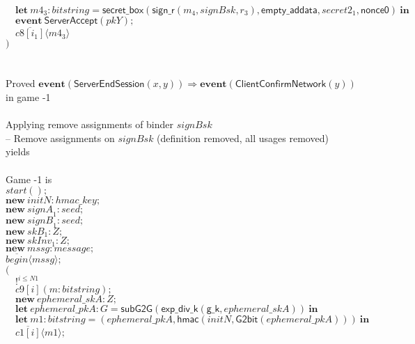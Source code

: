 \documentclass{article}
\newcommand{\cinput}[2]{{#1}({#2})}
\newcommand{\coutput}[2]{\overline{#1}\langle{#2}\rangle}
\newcommand{\kw}[1]{\mathbf{#1}}
\newcommand{\kwf}[1]{\mathsf{#1}}
\newcommand{\var}[1]{\mathit{#1}}
\newcommand{\kwt}[1]{\mathit{#1}}
\newcommand{\kwp}[1]{\mathit{#1}}
\newcommand{\kwc}[1]{\mathit{#1}}
\begin{document}
\begin{tabbing}
\>$\quad \kw{let}\ \var{m4}_{3}: \kwt{bitstring} = \kwf{secret{\_}box}(\kwf{sign{\_}r}(\var{m}_{4}, \var{signBsk}, \var{r}_{3}), \kwf{empty{\_}addata}, \var{secret2}_{1}, \kwf{nonce0})\ \kw{in}$\\
\>$\quad \kw{event}\ \kwf{ServerAccept}(\var{pkY});$\\
\>$\quad \coutput{\kwc{c8}[\var{i}_{1}]}{\var{m4}_{3}}$\\
\>$)$\\
\\
\\
Proved $\kw{event}(\kwf{ServerEndSession}(\var{x}, \var{y})) \Longrightarrow \kw{event}(\kwf{ClientConfirmNetwork}(\var{y}))$ in game -1\\
\\
Applying remove assignments of binder $\var{signBsk}$\\
\quad -- Remove assignments on $\var{signBsk}$ (definition removed, all usages removed)\\
yields\\
\\
Game -1 is\\
\>$\cinput{\kwc{start}}{};$\\
\>$\kw{new}\ \var{initN}: \kwt{hmac{\_}key};$\\
\>$\kw{new}\ \var{signA}_{1}: \kwt{seed};$\\
\>$\kw{new}\ \var{signB}_{1}: \kwt{seed};$\\
\>$\kw{new}\ \var{skB}_{1}: \kwt{Z};$\\
\>$\kw{new}\ \var{skInv}_{1}: \kwt{Z};$\\
\>$\kw{new}\ \var{mssg}: \kwt{message};$\\
\>$\coutput{\kwc{begin}}{\var{mssg}};$\\
\>$($\\
\>$\quad !^{\var{i} \leq \kwp{N1}}$\\
\>$\quad \cinput{\kwc{c9}[\var{i}]}{\var{m}: \kwt{bitstring}};$\\
\>$\quad \kw{new}\ \var{ephemeral{\_}skA}: \kwt{Z};$\\
\>$\quad \kw{let}\ \var{ephemeral{\_}pkA}: \kwt{G} = \kwf{subG2G}(\kwf{exp{\_}div{\_}k}(\kwf{g{\_}k}, \var{ephemeral{\_}skA}))\ \kw{in}$\\
\>$\quad \kw{let}\ \var{m1}: \kwt{bitstring} = \kwf{}(\var{ephemeral{\_}pkA}, \kwf{hmac}(\var{initN}, \kwf{G2bit}(\var{ephemeral{\_}pkA})))\ \kw{in}$\\
\>$\quad \coutput{\kwc{c1}[\var{i}]}{\var{m1}};$\\

\end{tabbing}
\end{document}
